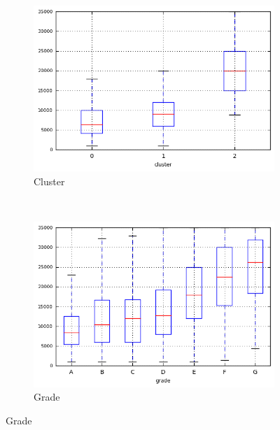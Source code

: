 \begin{figure}[!ht]
    \centering
        \caption{funded\textunderscore amnt }
        \begin{subfigure}[t]{0.45\textwidth}
            \centering
            \caption{Cluster }

            \centerline{\includegraphics[width=1\textwidth]{img/funded_amnt_by_cluster}}
        \end{subfigure}%
        ~ 
        \begin{subfigure}[t]{0.45\textwidth}
            \centering
            \caption{Grade }
   
            \centerline{\includegraphics[width=1\textwidth]{img/funded_amnt_by_grade}}

        \end{subfigure}
\end{figure}

